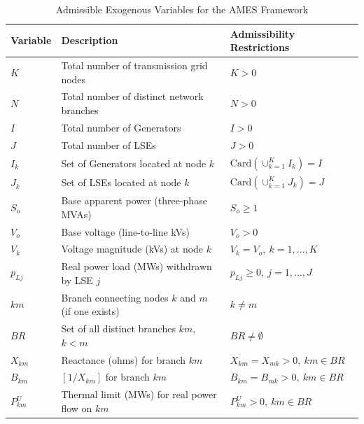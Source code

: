 \documentclass[12pt]{article}
\begin{document}




\begin{table}[h]
	\caption{Admissible Exogenous Variables for the AMES Framework} 
	\label{tab:ExogVarAdmissibility}
\begin{minipage}{\textwidth}
	\centering
\begin{tabular}{lll} 

\hline\hline

Variable	& Description & Admissibility Restrictions   \\ [0.5ex]
\hline
 	$K$   & Total number of transmission grid nodes   & $K>0$   \\[0.5ex]
 	$N$   & Total number of distinct network branches & $N>0$   \\[0.5ex]
 	$I$   & Total number of Generators                & $I>0$   \\[0.5ex]
 	$J$   & Total number of LSEs                      & $J>0$   \\[0.5ex]
 	$I_k$ & Set of Generators located at node $k$ &  $\mbox{Card}(\cup_{k=1}^K I_k) = I$ \\[0.5ex]
 	$J_k$ & Set of LSEs located at node $k$       &  $\mbox{Card}(\cup_{k=1}^K J_k) = J$ \\[0.5ex]
  $S_o$       & Base apparent power (three-phase MVAs)            &  $S_o \ge 1$ \\[0.5ex]
  $V_o$       & Base voltage (line-to-line kVs)          &  $V_o > 0$ \\[0.5ex]
  $V_k$       & Voltage magnitude (kVs) at node $k$      &  $V_k = V_o,~k=1,\ldots ,K$ \\[0.5ex]
  $p_{Lj}$    & Real power load (MWs) withdrawn by LSE $j$      & $p_{Lj}\ge 0, ~j=1,\ldots,J$ \\[0.5ex]
  $km$        & Branch connecting nodes $k$ and $m$ (if one exists) &  $k\ne m$ \\[0.5ex]
  $BR$        & Set of all distinct branches $km$, $k < m$ &  $BR\neq \emptyset$\\[0.5ex]
  $X_{km}$    & Reactance (ohms) for branch $km$ & $X_{km}=X_{mk} > 0,~km\in BR$\\[0.5ex]
  $B_{km}$    & $[1/X_{km}]$ for branch $km$                  & $B_{km}=B_{mk} > 0,~km\in BR$\\[0.5ex]
  $P^U_{km}$  & Thermal limit (MWs) for real power flow on $km$  & $P^U_{km} > 0,~km\in BR$\\[0.5ex]

\end{tabular}
\end{minipage}
\end{table}
\end{document}
